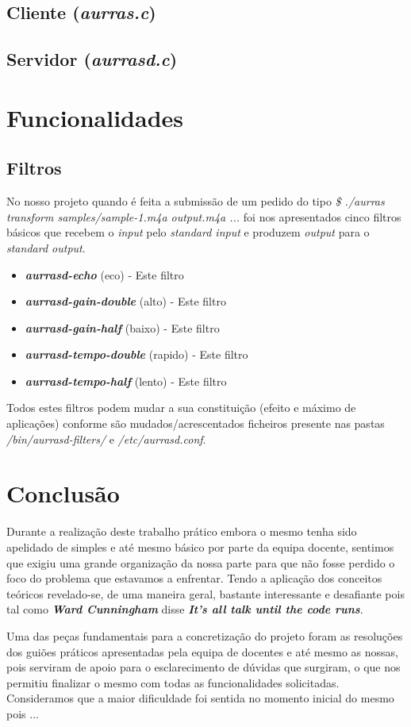 \documentclass[11pt,a4paper]{report}
\begin{document}
\section{Cliente (\emph{aurras.c})}

\section{Servidor (\emph{aurrasd.c})}

\chapter{Funcionalidades}



\section{Filtros}

No nosso projeto quando é feita a submissão de um pedido do tipo \emph{\$ ./aurras transform samples/sample-1.m4a output.m4a ...} foi nos apresentados cinco filtros básicos que recebem o \emph{input} pelo \emph{standard input} e produzem \emph{output} para o \emph{standard output}.

\begin{itemize}
\item \emph{\textbf{aurrasd-echo}} (eco) - Este filtro
\item \emph{\textbf{aurrasd-gain-double}} (alto) - Este filtro
\item \emph{\textbf{aurrasd-gain-half}} (baixo) - Este filtro
\item \emph{\textbf{aurrasd-tempo-double}} (rapido) - Este filtro
\item \emph{\textbf{aurrasd-tempo-half}} (lento) - Este filtro
\end{itemize}

Todos estes filtros podem mudar a sua constituição (efeito e máximo de aplicações) conforme são mudados/acrescentados ficheiros presente nas pastas \emph{/bin/aurrasd-filters/} e \emph{/etc/aurrasd.conf}.

\chapter{Conclusão}

Durante a realização deste trabalho prático embora o mesmo tenha sido apelidado de simples e até mesmo básico por parte da equipa docente, sentimos que exigiu uma grande organização da nossa parte para que não fosse perdido o foco do problema que estavamos a enfrentar. Tendo a aplicação dos conceitos teóricos revelado-se, de uma maneira geral, bastante interessante e desafiante pois tal como \emph{\textbf{Ward Cunningham}} disse \emph{\textbf{It's all talk until the code runs}}. 

Uma das peças fundamentais para a concretização do projeto foram as resoluções dos guiões práticos apresentadas pela equipa de docentes e até mesmo as nossas, pois serviram de apoio para o esclarecimento de dúvidas que surgiram, o que nos permitiu finalizar o mesmo com todas as funcionalidades solicitadas. Consideramos que a maior dificuldade foi sentida no momento inicial do mesmo pois ...
\end{document}
